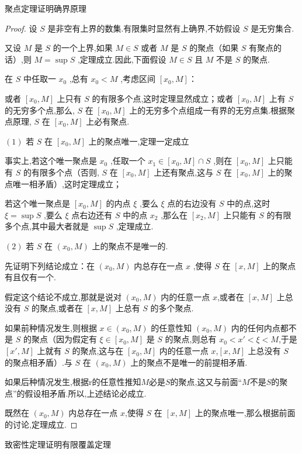 \begin{proposition}
	聚点定理证明确界原理
\end{proposition}

\begin{proof}
	设 $S$ 是非空有上界的数集.有限集时显然有上确界,不妨假设 $S$ 是无穷集合.

又设 $M$ 是 $S$ 的一个上界,如果 $M \in S$ 或者 $M$ 是 $S$ 的聚点（如果 $S$ 有聚点的话）,则 $M = \sup S$ ,定理成立.因此,下面假设 $M \in S$ 且 $M$ 不是 $S$ 的聚点.

在 $S$ 中任取一 $x_0$ ,总有 $x_0 < M$ ,考虑区间 $[x_0, M]$：

或者 $[x_0, M]$ 上只有 $S$ 的有限多个点,这时定理显然成立；或者 $[x_0, M]$ 上有 $S$ 的无穷多个点,那么, $S$ 在 $[x_0, M]$ 上的无穷多个点组成一有界的无穷点集.根据聚点原理, $S$ 在 $[x_0, M]$ 上必有聚点.

$(1)$ 若 $S$ 在 $[x_0, M]$ 上的聚点唯一,定理一定成立

事实上,若这个唯一聚点是 $x_0$ ,任取一个 $x_1 \in [x_0, M] \cap S$ ,则在 $[x_0, M]$ 上只能有 $S$ 的有限多个点（否则, $S$ 在 $[x_0, M]$ 上还有聚点,这与 $S$ 在 $[x_0, M]$ 上的聚点唯一相矛盾）,这时定理成立；

若这个唯一聚点是 $[x_0, M]$ 的内点 $\xi$ ,要么 $\xi$ 点的右边没有 $S$ 中的点,这时 $\xi = \sup S$ ,要么 $\xi$ 点右边还有 $S$ 中的点 $x_2$ ,那么在 $[x_2, M]$ 上只能有 $S$ 的有限多个点,其中最大者就是 $\sup S$ ,定理成立.

$(2)$ 若 $S$ 在 $(x_0, M)$ 上的聚点不是唯一的.

先证明下列结论成立：在 $(x_0, M)$ 内总存在一点 $x$ ,使得 $S$ 在 $[x, M]$ 上的聚点有且仅有一个.

假定这个结论不成立,那就是说对 $(x_0, M)$ 内的任意一点 $x$,或者在 $[x, M]$ 上总没有 $S$ 的聚点,或者在 $[x, M]$ 上总有 $S$ 的多个聚点.

如果前种情况发生,则根据 $x \in (x_0, M)$ 的任意性知 $(x_0, M)$ 内的任何内点都不是 $S$ 的聚点（因为假定有 $\xi \in [x_0, M]$ 是 $S$ 的聚点,则总有 $x_0 < x' < \xi < M$,于是 $[x', M]$ 上就有 $S$ 的聚点,这与在 $[x_0, M]$ 内的任意一点 $x$,$[x, M]$ 上总没有 $S$ 的聚点相矛盾）.与 $S$ 在 $(x_0, M)$ 上的聚点不是唯一的前提相矛盾.

如果后种情况发生,根据r的任意性推知$M$必是$S$的聚点,这又与前面“$M$不是$S$的聚点”的假设相矛盾.所以,上述结论必成立.

既然在 $(x_0, M)$ 内总存在一点 $x$,使得 $S$ 在 $[x, M]$ 上的聚点唯一,那么根据前面的讨论,定理成立.
\end{proof}

\begin{proposition}
	致密性定理证明有限覆盖定理
\end{proposition}

